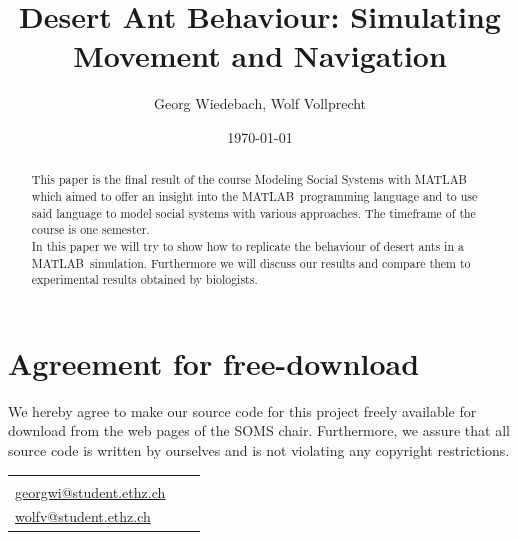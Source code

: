 \documentclass[11pt]{article}
\title{Desert Ant Behaviour: Simulating Movement and Navigation}
\author{Georg Wiedebach, Wolf Vollprecht}
\date{\today}
\begin{document}

\newpage


\newpage
\section*{Agreement for free-download}
\bigskip


\bigskip


\large We hereby agree to make our source code for this project freely available for download from the web pages of the SOMS chair. Furthermore, we assure that all source code is written by ourselves and is not violating any copyright restrictions.

\begin{center}

\bigskip


\bigskip


\begin{tabular}{@{}p{3.3cm}@{}p{6cm}@{}@{}p{6cm}@{}}
\begin{minipage}{3cm}

\end{minipage}
&
\begin{minipage}{6cm}
\large Georg Wiedebach\\
\href{mailto:georgwi@student.ethz.ch}{georgwi@student.ethz.ch}
\end{minipage}
&
\begin{minipage}{6cm}

\large Wolf Vollprecht\\
\href{mailto:wolfv@student.ethz.ch}{wolfv@student.ethz.ch}

\end{minipage}
\end{tabular}


\end{center}
\newpage





\begin{abstract}
This paper is the final result of the course {\sc Modeling Social Systems with MATLAB\texttrademark} which aimed to offer an insight into the MATLAB\texttrademark\ programming language and to use said language to model social systems with various approaches. The timeframe of the course is one semester. \\
In this paper we will try to show how to replicate the behaviour of desert ants in a MATLAB\texttrademark\ simulation. Furthermore we will discuss our results and compare them to experimental results obtained by biologists.
\end{abstract}
\end{document}
